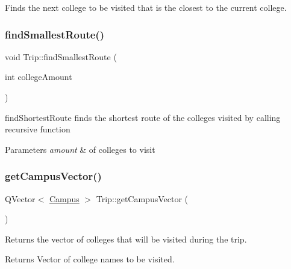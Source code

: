 Finds the next college to be visited that is the closest to the current college. 

\mbox{\label{class_trip_ac5c7c1f7e9d4c62005f6677d971a270e}} 
\subsubsection{\texorpdfstring{find\+Smallest\+Route()}{findSmallestRoute()}\hspace{0.1cm}{\footnotesize\ttfamily [2/2]}}
{\footnotesize\ttfamily void Trip\+::find\+Smallest\+Route (\begin{DoxyParamCaption}\item[{int}]{college\+Amount }\end{DoxyParamCaption})}



find\+Shortest\+Route finds the shortest route of the colleges visited by calling recursive function 


\begin{DoxyParams}{Parameters}
{\em amount} & of colleges to visit \\
\hline
\end{DoxyParams}
\mbox{\label{class_trip_afb76381fc49c04660a203d8a5de70983}} 
\subsubsection{\texorpdfstring{get\+Campus\+Vector()}{getCampusVector()}}
{\footnotesize\ttfamily Q\+Vector$<$ \hyperlink{class_campus}{Campus} $>$ Trip\+::get\+Campus\+Vector (\begin{DoxyParamCaption}{ }\end{DoxyParamCaption})}



Returns the vector of colleges that will be visited during the trip. 

\begin{DoxyReturn}{Returns}
Vector of college names to be visited. 
\end{DoxyReturn}
\mbox{\label{class_trip_a61d4bb1ca70f99d64d2ce0eae7424c5a}} 
